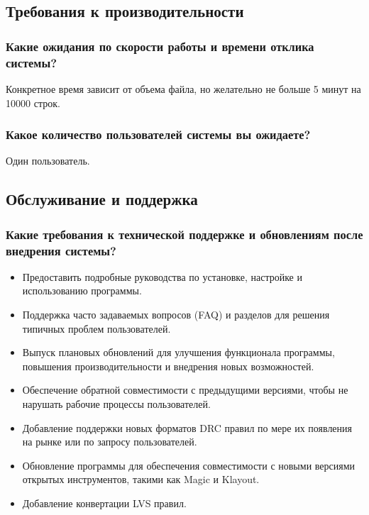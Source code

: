 \subsection{Требования к производительности}

\subsubsection{Какие ожидания по скорости работы и времени отклика системы?}
Конкретное время зависит от объема файла,
но желательно не больше 5 минут на 10000 строк.\par

\subsubsection{Какое количество пользователей системы вы ожидаете?}
Один пользователь.

\subsection{Обслуживание и поддержка}

\subsubsection{Какие требования к технической поддержке
	и обновлениям после внедрения системы?}

\begin{itemize}
	\item Предоставить подробные руководства по установке,
		настройке и использованию программы.
	\item Поддержка часто задаваемых вопросов (FAQ)
		и разделов для решения типичных проблем пользователей.
	\item Выпуск плановых обновлений для улучшения функционала программы,
		повышения производительности и внедрения новых возможностей.
	\item Обеспечение обратной совместимости с предыдущими версиями,
		чтобы не нарушать рабочие процессы пользователей.
	\item Добавление поддержки новых форматов DRC правил по мере
		их появления на рынке или по запросу пользователей.
	\item Обновление программы для обеспечения совместимости
		с новыми версиями открытых инструментов, такими как Magic и Klayout.
	\item Добавление конвертации LVS правил.
\end{itemize}

